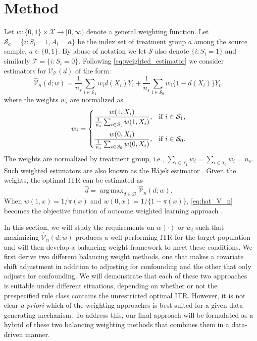 \documentclass[12pt]{article}
\DeclareMathOperator*{\argmax}{arg\,max}
\begin{document}
\section{Method} \label{sec:method}
Let $w: \{0, 1\} \times \mathcal{X} \rightarrow [0, \infty)$ denote a general weighting function. Let $\mathcal{S}_a = \{i: S_i = 1, A_i = a\}$ be the index set of treatment group $a$ among the source sample, $a \in \{0, 1\}$. By abuse of notation we let $\mathcal{S}$ also denote $\{i: S_i = 1\}$ and similarly $\mathcal{T} = \{i: S_i = 0\}$. Following \eqref{eq:weighted_estimator} we consider estimators for $\mathcal{V}_\mathcal{T}(d)$ of the form:
\begin{equation}
    \label{eq:hat_V_n}
    \widehat{\mathcal{V}}_n(d; w) = 
    \frac{1}{n_s} \sum_{i\in \mathcal{S}_1}  w_i d(X_i) Y_i +
    \frac{1}{n_s} \sum_{i\in \mathcal{S}_0}  w_i \{ 1-d(X_i) \} Y_i
,\end{equation}
where the weights $w_i$ are normalized as
\begin{equation*}
    w_i = \begin{cases}
        \dfrac{w(1, X_i)}{\tfrac{1}{n_s} \sum_{i \in \mathcal{S}_1} w(1, X_i)}, &\text{if } i \in \mathcal{S}_1, \vspace{6pt} \\
        \dfrac{w(0, X_i)}{\tfrac{1}{n_s} \sum_{i \in \mathcal{S}_0} w(0, X_i)}, &\text{if } i \in \mathcal{S}_0.
    \end{cases}
\end{equation*}
The weights are normalized by treatment group, i.e., $\sum_{i \in \mathcal{S}_1} w_i = \sum_{i \in \mathcal{S}_0} w_i = n_s $. Such weighted estimators are also known as the H\'ajek estimator \citep{chattopadhyay2020balancing}. Given the weights, the optimal ITR can be estimated as 
\begin{equation}
    \label{eq:weighting_learning}
    \hat{d} = \argmax_{d \in \mathcal{D}} \widehat{\mathcal{V}}_n(d; w)
.\end{equation}
When $w(1, x) = 1 / \pi(x)$ and $w(0, x) = 1 / \{ 1 - \pi(x) \}$, \eqref{eq:hat_V_n} becomes the objective function of outcome weighted learning approach \citep{zhao2012estimating}. 

In this section, we will study the requirements on $w(\cdot)$ or $w_i$ such that maximizing $\widehat{\mathcal{V}}_n(d; w)$ produces a well-performing ITR for the target population and will then develop a balancing weight framework to meet these conditions. 
We first derive two different balancing weight methods, one that makes a covariate shift adjustment in addition to adjusting for confounding and the other that only adjusts for confounding. We will demonstrate that each of these two approaches is suitable under different situations, depending on whether or not the prespecified rule class contains the unrestricted optimal ITR. However, it is not clear \textit{a priori} which of the weighting approaches is best suited for a given data-generating mechanism. To address this, 
our final approach will be formulated as a hybrid of these two balancing weighting methods that combines them in a data-driven manner. 
\end{document}
